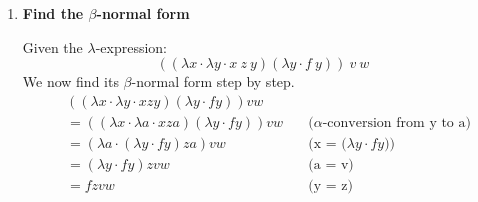 \documentclass[10pt, a4paper]{article}
\begin{document}
\begin{enumerate}
So the result of ``greater 2 1'' is the same as result of ``greater 1 0''. Let’s now evaluate that:
\begin{align*}
\text{greater} \ 1 \ 0 &= (\lambda a \cdot \lambda b \cdot ((\text{zero?} \ a) \ \text{false} \ ((\text{zero?} \ b) \ \text{true} \ (\text{greater} \ (\text{pred} \ a) \ (\text{pred} \ b))))) \ 1 \ 0 \\
&= (\lambda b \cdot ((\text{zero?} \ 1) \ \text{false} \ ((\text{zero?} \ b) \ \text{true} \ (\text{greater} \ (\text{pred} \ 1) \ (\text{pred} \ b))))) \ 0 
\hspace{5em} \text{(a = 1)} \\
&= ((\text{zero?} \ 1) \ \text{false} \ ((\text{zero?} \ 0) \ \text{true} \ (\text{greater} \ (\text{pred} \ 1) \ (\text{pred} \ 0))))
\hspace{7em} \text{(b = 0)} \\
&= \text{false} \ \text{false} \ (\text{true} \ \text{true} \ (\text{greater} \ 0 \ \text{false})) \
\hspace{10em} \text{(reduction of zero? and pred)} \\
&= \text{true} \ \text{true} \ (\text{greater} \ 0 \ \text{false})
\hspace{17em} \text{(reduction of false)} \\
&= \text{true}
\end{align*}

So the $\beta$-normal form of the expression ``greater 2 1'' is ``true''.


    \item \textbf{Find the $\beta$-normal form}

Given the $\lambda$-expression:
\[
((\lambda x \cdot \lambda y \cdot x \ z \ y) (\lambda y \cdot f \ y)) \ v \ w
\]
We now find its $\beta$-normal form  step by step.
\begin{align*}
&((\lambda x \cdot \lambda y \cdot x z y)(\lambda y \cdot f y)) v w \\
&= ((\lambda x \cdot \lambda a \cdot x z a)(\lambda y \cdot f y)) v w
&\quad \text{(\(\alpha\)-conversion from y to a)} \\
&= (\lambda a \cdot (\lambda y \cdot f y) z a) v w 
&\quad \text{(x = (\(\lambda y \cdot f y\)))} \\
&= (\lambda y \cdot f y) z v w 
&\quad \text{(a = v)} \\
&= f z v w
&\quad \text{(y = z)} \\
\end{align*}

\end{enumerate}
\end{document}
